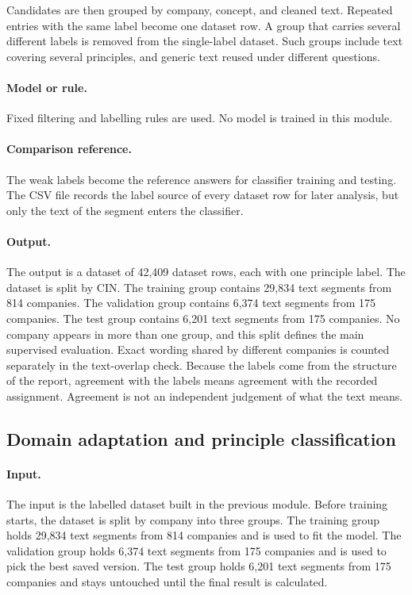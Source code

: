 Candidates are then grouped by company, concept, and cleaned text. Repeated entries with the same label become one dataset row. A group that carries several different labels is removed from the single-label dataset. Such groups include text covering several principles, and generic text reused under different questions.

\paragraph{Model or rule.} Fixed filtering and labelling rules are used. No model is trained in this module.

\paragraph{Comparison reference.} The weak labels become the reference answers for classifier training and testing. The CSV file records the label source of every dataset row for later analysis, but only the text of the segment enters the classifier.

\paragraph{Output.} The output is a dataset of 42,409 dataset rows, each with one principle label. The dataset is split by CIN. The training group contains 29,834 text segments from 814 companies. The validation group contains 6,374 text segments from 175 companies. The test group contains 6,201 text segments from 175 companies. No company appears in more than one group, and this split defines the main supervised evaluation. Exact wording shared by different companies is counted separately in the text-overlap check. Because the labels come from the structure of the report, agreement with the labels means agreement with the recorded assignment. Agreement is not an independent judgement of what the text means.

\subsection{Domain adaptation and principle classification}
\label{sec:classifier}

\paragraph{Input.} The input is the labelled dataset built in the previous module. Before training starts, the dataset is split by company into three groups. The training group holds 29,834 text segments from 814 companies and is used to fit the model. The validation group holds 6,374 text segments from 175 companies and is used to pick the best saved version. The test group holds 6,201 text segments from 175 companies and stays untouched until the final result is calculated.


